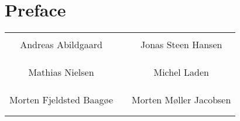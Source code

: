 \section*{Preface}

\phantom{Luft}\vspace{5cm}
\begin{table}[H]
	\centering
		\begin{tabular}{c c c}
			\underline{\phantom{JAERJAERJAERJAERGO}} & \phantom{cookies} & \underline{\phantom{JAERJAERJAERJAERGO}} \\
			Andreas Abildgaard			& \phantom{cookies} & Jonas Steen Hansen		\\
			&&\\
			&&\\
	   		\underline{\phantom{JAERJAERJAERJAERGO}} & \phantom{cookies} & \underline{\phantom{JAERJAERJAERJAERGO}} \\
			Mathias Nielsen 					& \phantom{cookies} & Michel Laden 			\\			
			&&\\
			&&\\
	   		\underline{\phantom{JAERJAERJAERJAERGO}} & \phantom{cookies} & \underline{\phantom{JAERJAERJAERJAERGO}} \\
			Morten Fjeldsted Baagøe 					& \phantom{cookies} & Morten Møller Jacobsen 			\\			
			&&\\
			&&\\			
		\end{tabular}
\end{table}

\pagebreak
